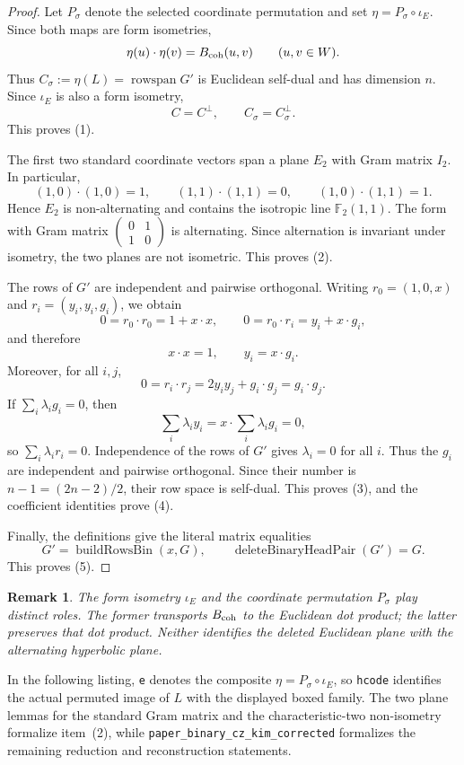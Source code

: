\documentclass[12pt]{article}
\newtheorem{remark}[theorem]{Remark}
\begin{document}
\begin{proof}
Let \(P_\sigma\) denote the selected coordinate permutation and set
\(\eta=P_\sigma\circ\iota_E\). Since both maps are form isometries,
\[
\eta(u)\cdot\eta(v)=B_{\rm coh}(u,v)
\qquad(u,v\in W).
\]
Thus \(C_\sigma:=\eta(L)=\operatorname{rowspan}G'\) is Euclidean
self-dual and has dimension \(n\). Since \(\iota_E\) is also a form
isometry,
\[
C=C^\perp,
\qquad
C_\sigma=C_\sigma^\perp.
\]
This proves (1).

The first two standard coordinate vectors span a plane \(E_2\) with Gram
matrix \(I_2\). In particular,
\[
(1,0)\cdot(1,0)=1,\qquad
(1,1)\cdot(1,1)=0,\qquad
(1,0)\cdot(1,1)=1.
\]
Hence \(E_2\) is non-alternating and contains the isotropic line
\(\mathbb F_2(1,1)\). The form with Gram matrix
\(\left(\begin{smallmatrix}0&1\\1&0\end{smallmatrix}\right)\) is
alternating. Since alternation is invariant under isometry, the two planes
are not isometric. This proves (2).

The rows of \(G'\) are independent and pairwise orthogonal. Writing
\(r_0=(1,0,x)\) and \(r_i=(y_i,y_i,g_i)\), we obtain
\[
0=r_0\cdot r_0=1+x\cdot x,
\qquad
0=r_0\cdot r_i=y_i+x\cdot g_i,
\]
and therefore
\[
x\cdot x=1,
\qquad y_i=x\cdot g_i.
\]
Moreover, for all \(i,j\),
\[
0=r_i\cdot r_j=2y_iy_j+g_i\cdot g_j=g_i\cdot g_j.
\]
If \(\sum_i\lambda_i g_i=0\), then
\[
\sum_i\lambda_i y_i
=x\cdot\sum_i\lambda_i g_i=0,
\]
so \(\sum_i\lambda_i r_i=0\). Independence of the rows of \(G'\) gives
\(\lambda_i=0\) for all \(i\). Thus the \(g_i\) are independent and
pairwise orthogonal. Since their number is \(n-1=(2n-2)/2\), their row
space is self-dual. This proves (3), and the coefficient identities prove
(4).

Finally, the definitions give the literal matrix equalities
\[
G'=\operatorname{buildRowsBin}(x,G),
\qquad
\operatorname{deleteBinaryHeadPair}(G')=G.
\]
This proves (5).
\end{proof}

\begin{remark}{\rm
The form isometry \(\iota_E\) and the coordinate permutation \(P_\sigma\)
play distinct roles.  The former transports \(B_{\rm coh}\) to the Euclidean
dot product; the latter preserves that dot product.  Neither identifies the
deleted Euclidean plane with the alternating hyperbolic plane.
}
\end{remark}

\noindent
In the following listing, \texttt{e} denotes the composite
\(\eta=P_\sigma\circ\iota_E\), so \texttt{hcode} identifies the actual
permuted image of \(L\) with the displayed boxed family. The two plane
lemmas for the standard Gram matrix and the characteristic-two non-isometry
formalize item~(2), while
\texttt{paper\_binary\_cz\_kim\_corrected} formalizes the remaining
reduction and reconstruction statements.
\end{document}
